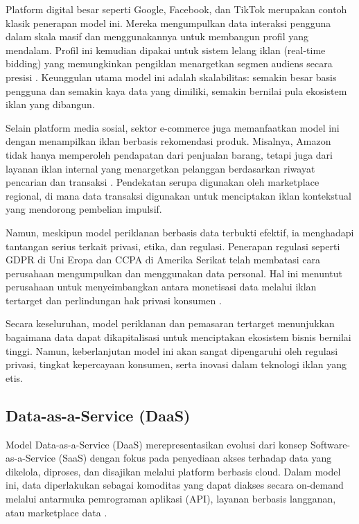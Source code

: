 Platform digital besar seperti Google, Facebook, dan TikTok merupakan contoh klasik penerapan model ini. Mereka mengumpulkan data interaksi pengguna dalam skala masif dan menggunakannya untuk membangun profil yang mendalam. Profil ini kemudian dipakai untuk sistem lelang iklan (real-time bidding) yang memungkinkan pengiklan menargetkan segmen audiens secara presisi \cite{goldfarb2011online}. Keunggulan utama model ini adalah skalabilitas: semakin besar basis pengguna dan semakin kaya data yang dimiliki, semakin bernilai pula ekosistem iklan yang dibangun.

Selain platform media sosial, sektor e-commerce juga memanfaatkan model ini dengan menampilkan iklan berbasis rekomendasi produk. Misalnya, Amazon tidak hanya memperoleh pendapatan dari penjualan barang, tetapi juga dari layanan iklan internal yang menargetkan pelanggan berdasarkan riwayat pencarian dan transaksi \cite{chen2019amazon}. Pendekatan serupa digunakan oleh marketplace regional, di mana data transaksi digunakan untuk menciptakan iklan kontekstual yang mendorong pembelian impulsif.

Namun, meskipun model periklanan berbasis data terbukti efektif, ia menghadapi tantangan serius terkait privasi, etika, dan regulasi. Penerapan regulasi seperti GDPR di Uni Eropa dan CCPA di Amerika Serikat telah membatasi cara perusahaan mengumpulkan dan menggunakan data personal. Hal ini menuntut perusahaan untuk menyeimbangkan antara monetisasi data melalui iklan tertarget dan perlindungan hak privasi konsumen \cite{zwitter2014, gdpr2021bigdata}.

Secara keseluruhan, model periklanan dan pemasaran tertarget menunjukkan bagaimana data dapat dikapitalisasi untuk menciptakan ekosistem bisnis bernilai tinggi. Namun, keberlanjutan model ini akan sangat dipengaruhi oleh regulasi privasi, tingkat kepercayaan konsumen, serta inovasi dalam teknologi iklan yang etis.

\subsection{Data-as-a-Service (DaaS)}

Model Data-as-a-Service (DaaS) merepresentasikan evolusi dari konsep Software-as-a-Service (SaaS) dengan fokus pada penyediaan akses terhadap data yang dikelola, diproses, dan disajikan melalui platform berbasis cloud. Dalam model ini, data diperlakukan sebagai komoditas yang dapat diakses secara on-demand melalui antarmuka pemrograman aplikasi (API), layanan berbasis langganan, atau marketplace data \cite{liu2020dataservice, lim2018business}. 

